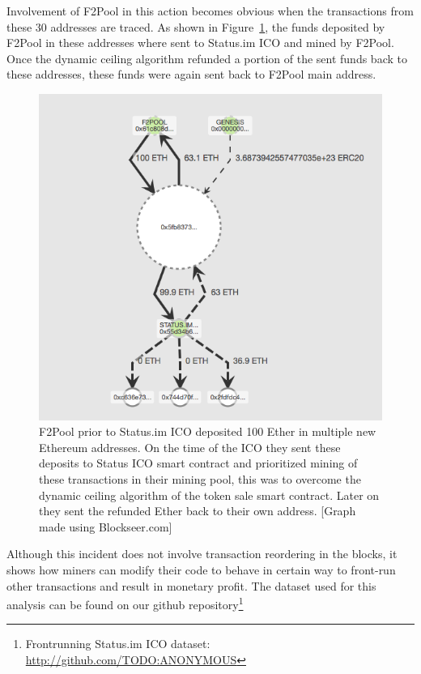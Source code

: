 



Involvement of F2Pool in this action becomes obvious when the transactions from these 30 addresses are traced. As shown in Figure~\ref{fig:f2poolfront-run}, the funds deposited by F2Pool in these addresses where sent to Status.im ICO and mined by F2Pool. Once the dynamic ceiling algorithm refunded a portion of the sent funds back to these addresses, these funds were again sent back to F2Pool main address. 


\begin{figure}[h]
\centering
\includegraphics[width=0.7\linewidth]{figures/F2Pool_transactions_to_StatusICO_and_Refunds.png}
\caption{F2Pool prior to Status.im ICO deposited 100 Ether in multiple new Ethereum addresses. On the time of the ICO they sent these deposits to Status ICO smart contract and prioritized mining of these transactions in their mining pool, this was to overcome the dynamic ceiling algorithm of the token sale smart contract. Later on they sent the refunded Ether back to their own address. [Graph made using Blockseer.com] \label{fig:f2poolfront-run}}
\end{figure}


Although this incident does not involve transaction reordering in the blocks, it shows how miners can modify their code to behave in certain way to front-run other transactions and result in monetary profit. The dataset used for this analysis can be found on our github repository\footnote{Frontrunning Status.im ICO dataset: \url{http://github.com/TODO:ANONYMOUS}}


